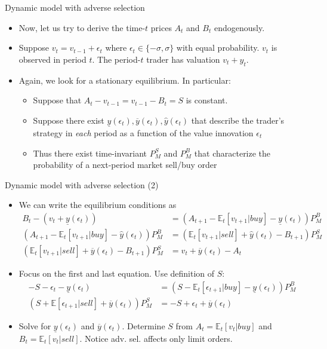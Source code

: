 \documentclass[english,10pt]{beamer}
\begin{document}
\begin{frame}[label=adverse]{Dynamic model with adverse selection}
	\begin{itemize}
		\item Now, let us try to derive the time-$t$ prices $A_t$ and $B_t$ endogenously. 
		\item Suppose $v_t=v_{t-1}+\epsilon_t$ where $\epsilon_t \in \{-\sigma, \sigma \}$ with equal probability. $v_t$ is observed in period $t$. The period-$t$ trader has valuation $v_t+y_t$. 
		\item Again, we look for a stationary equilibrium. In particular:
		\begin{itemize}
			\item Suppose that $A_t-v_{t-1}=v_{t-1}-B_t=S$ is constant.
			\item Suppose there exist $\underline{y}(\epsilon_t),\overline{y}(\epsilon_t),\hat{y}(\epsilon_t)$  that describe the trader's strategy in \textit{each} period  as a function of the value innovation $\epsilon_t$ 
			\item Thus there exist time-invariant $P^S_M$ and $P^B_M$ that characterize the probability of a next-period market sell/buy order 
		\end{itemize}
	\end{itemize}
\end{frame}


\begin{frame}{Dynamic model with adverse selection (2)}
	\begin{itemize}
		\item We can write the equilibrium conditions as
		\begin{align*}
		B_t-(v_t+\underline{y}(\epsilon_t)) 					& = (A_{t+1}-\mathbb{E}_t[v_{t+1}|buy]-\underline{y}(\epsilon_t) 	)P^B_M \\
		(A_{t+1}-\mathbb{E}_t[v_{t+1}|buy]-\hat{y}(\epsilon_t))P^B_M 			& = (\mathbb{E}_t[v_{t+1}|sell]+\hat{y}(\epsilon_t)-B_{t+1})P^S_M  \\
		(\mathbb{E}_t[v_{t+1}|sell]+\overline{y}(\epsilon_t)-B_{t+1}) P^S_M  	& = v_t+\overline{y}(\epsilon_t)-A_t 
		\end{align*}
		\item Focus on the first and last equation. Use definition of $S$:
		\begin{align*}
		-S-\epsilon_t-\underline{y}(\epsilon_t) 					& = (S-\mathbb{E}_t[\epsilon_{t+1}|buy]-\underline{y}(\epsilon_t) 	)P^B_M \\
		(S+\mathbb{E}[\epsilon_{t+1}|sell]+\overline{y}(\epsilon_t)) P^S_M  	& =-S+\epsilon_t+\overline{y}(\epsilon_t)
		\end{align*}
		\item Solve for $\underline{y}(\epsilon_t)$ and $\overline{y}(\epsilon_t)$. Determine $S$ from $A_t=\mathbb{E}_t[v_t|buy]$ and $B_t= \mathbb{E}_t[v_t|sell]$. Notice adv. sel. affects only limit orders. \hyperlink{adverseorg}{}
	\end{itemize}
\end{frame}
\end{document}

